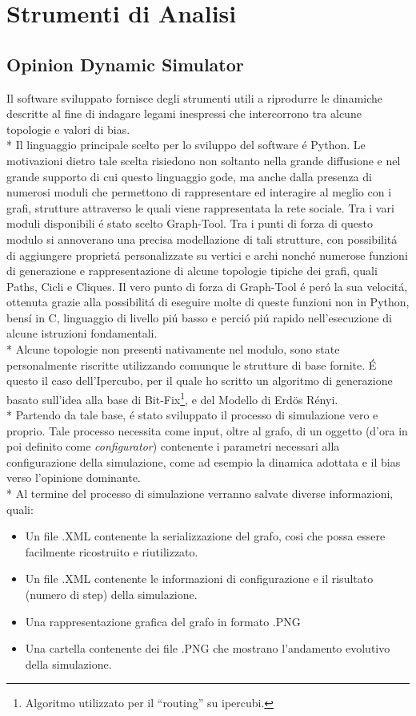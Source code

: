 \documentclass[../Tesi.tex]{subfiles}
\begin{document}
\chapter{Strumenti di Analisi}
\section{Opinion Dynamic Simulator}
Il software sviluppato fornisce degli strumenti utili a riprodurre le dinamiche descritte al fine di indagare legami inespressi che intercorrono tra alcune topologie e valori di bias.\\*
Il linguaggio principale scelto per lo sviluppo del software \'e Python. Le motivazioni dietro tale scelta risiedono non soltanto nella grande diffusione e nel grande supporto di cui questo linguaggio gode, ma anche dalla presenza di numerosi moduli che permettono di rappresentare ed interagire al meglio con i grafi, strutture attraverso le quali viene rappresentata la rete sociale.
Tra i vari moduli disponibili \'e stato scelto Graph-Tool. Tra i punti di forza di questo modulo si annoverano una precisa modellazione di tali strutture, con possibilit\'a di aggiungere propriet\'a personalizzate su vertici e archi nonch\'e numerose funzioni di generazione e rappresentazione di alcune topologie tipiche dei grafi, quali Paths, Cicli e Cliques. Il vero punto di forza di Graph-Tool \'e per\'o la sua velocit\'a, ottenuta grazie alla possibilit\'a di eseguire molte di queste funzioni non in Python, bens\'i in C, linguaggio di livello pi\'u basso e perci\'o pi\'u rapido nell'esecuzione di alcune istruzioni fondamentali.\\*
Alcune topologie non presenti nativamente nel modulo, sono state personalmente riscritte utilizzando comunque le strutture di base fornite. \'E questo il caso dell'Ipercubo, per il quale ho scritto un algoritmo di generazione basato sull'idea alla base di Bit-Fix\footnote{Algoritmo utilizzato per il ``routing'' su ipercubi.}, e del Modello di Erd{\"o}s R\'enyi.\\*
Partendo da tale base, \'e stato sviluppato il processo di simulazione vero e proprio. Tale processo necessita come input, oltre al grafo, di un oggetto (d'ora in poi definito come \emph{configurator}) contenente i parametri necessari alla configurazione della simulazione, come ad esempio la dinamica adottata e il bias verso l'opinione dominante.\\* 
Al termine del processo di simulazione verranno salvate diverse informazioni, quali:
\begin{itemize}
\item Un file .XML contenente la serializzazione del grafo, cosi che possa essere facilmente ricostruito e riutilizzato.
\item Un file .XML contenente le informazioni di configurazione e il risultato (numero di step) della simulazione.
\item Una rappresentazione grafica del grafo in formato .PNG
\item Una cartella contenente dei file .PNG che mostrano l'andamento evolutivo della simulazione.
\end{itemize}
\end{document}
